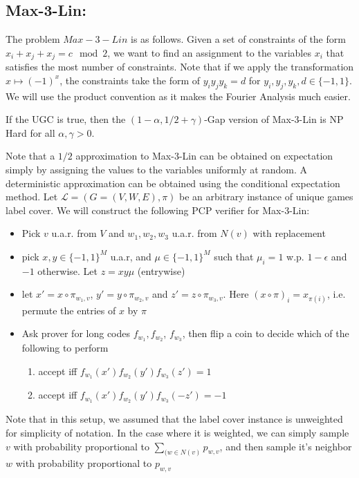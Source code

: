 \documentclass{article}
\newcommand{\1}{\mathbbm{1}}
\begin{document}
\subsection*{Max-3-Lin:}
The problem $Max-3-Lin$ is as follows. Given a set of constraints of the form $x_i + x_j + x_j = c \mod 2$, we want to find an assignment to the variables $x_i$ that satisfies the most number of constraints. Note that if we apply the transformation $x\mapsto (-1)^x$, the constraints take the form of $y_iy_jy_k = d$ for $y_i,y_j,y_k,d\in \{-1,1\}$. We will use the product convention as it makes the Fourier Analysis much easier.
\begin{theorem}
If the UGC is true, then the $(1-\alpha, 1/2+\gamma)$-Gap version of Max-3-Lin is NP Hard for all $\alpha,\gamma > 0$.
\end{theorem}
Note that a $1/2$ approximation to Max-3-Lin can be obtained on expectation simply by assigning the values to the variables uniformly at random. A deterministic approximation can be obtained using the conditional expectation method. Let $\mathcal{L} = (G=(V,W,E), \pi)$ be an arbitrary instance of unique games label cover. We will construct the following PCP verifier for Max-3-Lin:
\begin{itemize}
    \item Pick $v$ u.a.r. from $V$ and $w_1, w_2, w_3$ u.a.r. from $N(v)$ with replacement
    \item pick $x,y\in \{-1,1\}^M$ u.a.r, and $\mu\in\{-1,1\}^M$ such that $\mu_i = 1$ w.p. $1-\epsilon$ and $-1$ otherwise. Let $z=xy\mu$ (entrywise)
    \item let $x' = x\circ \pi_{w_1,v}$, $y'=y\circ \pi_{w_2, v}$ and $z'=z\circ \pi_{w_3,v}$. Here $(x \circ \pi)_i = x_{\pi(i)}$, i.e. permute the entries of $x$ by $\pi$
    \item Ask prover for long codes $f_{w_1}, f_{w_2}$, $f_{w_3}$, then flip a coin to decide which of the following to perform
    \begin{enumerate}
        \item accept iff $f_{w_1}(x')f_{w_2}(y')f_{w_3}(z') = 1$
        \item accept iff $f_{w_1}(x')f_{w_2}(y')f_{w_3}(-z') = -1$
    \end{enumerate}
\end{itemize}
Note that in this setup, we assumed that the label cover instance is unweighted for simplicity of notation. In the case where it is weighted, we can simply sample $v$ with probability proportional to $\sum_{(w\in N(v)}p_{w,v}$, and then sample it's neighbor $w$ with probability proportional to $p_{w,v}$
\end{document}
